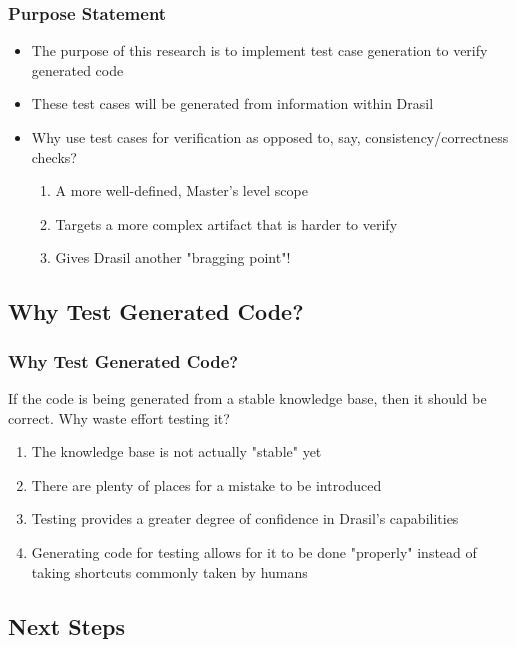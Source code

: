 \documentclass{beamer}
\begin{document}
\begin{frame}
    \frametitle{Purpose Statement}
    \begin{itemize}
        \item The purpose of this research is to implement test case generation
              to verify generated code
        \item These test cases will be generated from information within Drasil
        \item<2-> Why use test cases for verification as opposed to, say,
              consistency/correctness checks?
              \begin{enumerate}
                  \item<3-> A more well-defined, Master's level scope
                  \item<4-> Targets a more complex artifact that is harder to verify
                  \item<5-> Gives Drasil another "bragging point"!
              \end{enumerate}
    \end{itemize}
\end{frame}

\subsection{Why Test Generated Code?}

\begin{frame}
    \frametitle{Why Test Generated Code?}
    If the code is being generated from a stable knowledge base,
    then it should be correct. Why waste effort testing it?
    \begin{enumerate}
        \item<2-> The knowledge base is not actually "stable" yet
        \item<3-> There are plenty of places for a mistake to be introduced
        \item<4-> Testing provides a greater degree of confidence in
              Drasil's capabilities
        \item<5-> Generating code for testing allows for it to be done
              "properly" instead of taking shortcuts commonly taken by humans
    \end{enumerate}
\end{frame}

\subsection{Next Steps}
\end{document}
